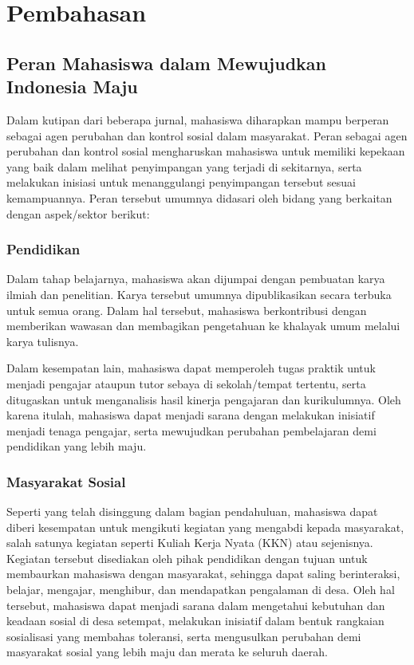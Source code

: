 \chapter{Pembahasan}


\section{Peran Mahasiswa dalam Mewujudkan Indonesia Maju}

Dalam kutipan dari beberapa jurnal, mahasiswa diharapkan mampu berperan sebagai agen perubahan dan kontrol sosial dalam masyarakat. Peran sebagai agen perubahan dan kontrol sosial mengharuskan mahasiswa untuk memiliki kepekaan yang baik dalam melihat penyimpangan yang terjadi di sekitarnya, serta melakukan inisiasi untuk menanggulangi penyimpangan tersebut sesuai kemampuannya. Peran tersebut umumnya didasari oleh bidang yang berkaitan dengan aspek/sektor berikut: 

\subsection{Pendidikan}

Dalam tahap belajarnya, mahasiswa akan dijumpai dengan pembuatan karya ilmiah dan penelitian. Karya tersebut umumnya dipublikasikan secara terbuka untuk semua orang. Dalam hal tersebut, mahasiswa berkontribusi dengan memberikan wawasan dan membagikan pengetahuan ke khalayak umum melalui karya tulisnya. 

Dalam kesempatan lain, mahasiswa dapat memperoleh tugas praktik untuk menjadi pengajar ataupun tutor sebaya di sekolah/tempat tertentu, serta ditugaskan untuk menganalisis hasil kinerja pengajaran dan kurikulumnya. Oleh karena itulah, mahasiswa dapat menjadi sarana dengan melakukan inisiatif menjadi tenaga pengajar, serta mewujudkan perubahan pembelajaran demi pendidikan yang lebih maju.

\subsection{Masyarakat Sosial}

Seperti yang telah disinggung dalam bagian pendahuluan, mahasiswa dapat diberi kesempatan untuk mengikuti kegiatan yang mengabdi kepada masyarakat, salah satunya kegiatan seperti Kuliah Kerja Nyata (KKN) atau sejenisnya. Kegiatan tersebut disediakan oleh pihak pendidikan dengan tujuan untuk membaurkan mahasiswa dengan masyarakat, sehingga dapat saling berinteraksi, belajar, mengajar, menghibur, dan mendapatkan pengalaman di desa. Oleh hal tersebut, mahasiswa dapat menjadi sarana dalam mengetahui kebutuhan dan keadaan sosial di desa setempat, melakukan inisiatif dalam bentuk rangkaian sosialisasi yang membahas toleransi, serta mengusulkan perubahan demi masyarakat sosial yang lebih maju dan merata ke seluruh daerah. 

